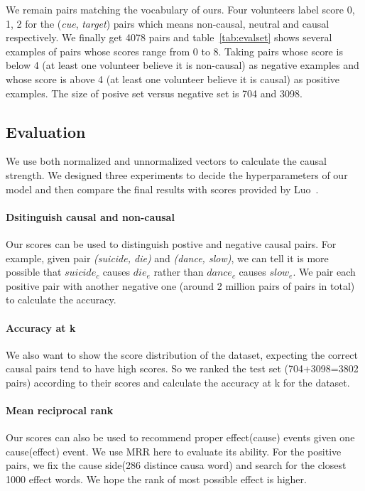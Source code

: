 We remain pairs matching the vocabulary of ours. Four volunteers label score 0, 1, 2 for the (\emph{cue}, \emph{target}) pairs which means non-causal, neutral and causal respectively. We finally get 4078 pairs and table~\ref{tab:evalset} shows several examples of pairs whose scores range from 0 to 8. Taking pairs whose score is below 4 (at least one volunteer believe it is non-causal) as negative examples and whose score is above 4 (at least one volunteer believe it is causal) as positive examples. The size of posive set versus negative set is 704 and 3098. 

\subsection{Evaluation}
We use both normalized and unnormalized vectors to calculate the causal strength. We designed three experiments to decide the hyperparameters of our model and then compare the final results with scores provided by Luo~\cite{luo2016commonsense}.

\paragraph{Dsitinguish causal and non-causal}
Our scores can be used to distinguish postive and negative causal pairs. For example, given pair \emph{(suicide, die)} and \emph{(dance, slow)}, we can tell it is more possible that \emph{$suicide_c$} causes \emph{$die_e$} rather than \emph{$dance_c$} causes \emph{$slow_e$}. We pair each positive pair with another negative one (around 2 million pairs of pairs in total) to calculate the accuracy. 

\paragraph{Accuracy at k}
We also want to show the  score distribution of the dataset, expecting the correct causal pairs tend to have high scores. So we ranked the test set (704+3098=3802 pairs) according to their scores and calculate the accuracy at k for the dataset.

\paragraph{Mean reciprocal rank} 
Our scores can also be used to recommend proper effect(cause) events given one cause(effect) event. We use MRR here to evaluate its ability. For the positive pairs, we fix the cause side(286 distince causa word) and search for the closest 1000 effect words. We hope the rank of most possible effect is higher.
 
